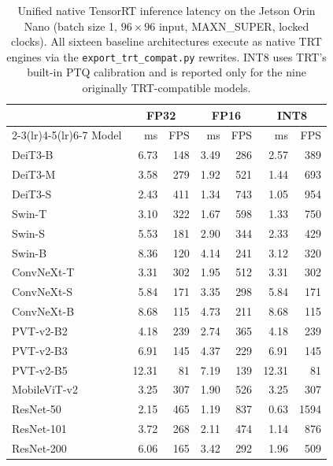 \begin{table}[t]
\centering
\caption{Unified native TensorRT inference latency on the Jetson Orin Nano
(batch size 1, $96\times96$ input, MAXN\_SUPER, locked clocks). All sixteen
baseline architectures execute as native TRT engines via the
\texttt{export\_trt\_compat.py} rewrites. INT8 uses TRT's built-in PTQ
calibration and is reported only for the nine originally TRT-compatible
models.}
\label{tab:jetson-latency-full}
\footnotesize
\begin{tabular*}{\linewidth}{@{\extracolsep{\fill}} l r r r r r r}
\toprule
& \multicolumn{2}{c}{FP32} & \multicolumn{2}{c}{FP16} & \multicolumn{2}{c}{INT8} \\
\cmidrule(lr){2-3}\cmidrule(lr){4-5}\cmidrule(lr){6-7}
Model & ms & FPS & ms & FPS & ms & FPS \\
\midrule
DeiT3-B & 6.73 & 148 & 3.49 & 286 & 2.57 & 389 \\
DeiT3-M & 3.58 & 279 & 1.92 & 521 & 1.44 & 693 \\
DeiT3-S & 2.43 & 411 & 1.34 & 743 & 1.05 & 954 \\
Swin-T & 3.10 & 322 & 1.67 & 598 & 1.33 & 750 \\
Swin-S & 5.53 & 181 & 2.90 & 344 & 2.33 & 429 \\
Swin-B & 8.36 & 120 & 4.14 & 241 & 3.12 & 320 \\
ConvNeXt-T & 3.31 & 302 & 1.95 & 512 & 3.31 & 302 \\
ConvNeXt-S & 5.84 & 171 & 3.35 & 298 & 5.84 & 171 \\
ConvNeXt-B & 8.68 & 115 & 4.73 & 211 & 8.68 & 115 \\
PVT-v2-B2 & 4.18 & 239 & 2.74 & 365 & 4.18 & 239 \\
PVT-v2-B3 & 6.91 & 145 & 4.37 & 229 & 6.91 & 145 \\
PVT-v2-B5 & 12.31 & 81 & 7.19 & 139 & 12.31 & 81 \\
MobileViT-v2 & 3.25 & 307 & 1.90 & 526 & 3.25 & 307 \\
ResNet-50 & 2.15 & 465 & 1.19 & 837 & 0.63 & 1594 \\
ResNet-101 & 3.72 & 268 & 2.11 & 474 & 1.14 & 876 \\
ResNet-200 & 6.06 & 165 & 3.42 & 292 & 1.96 & 509 \\
\bottomrule
\end{tabular*}
\end{table}
